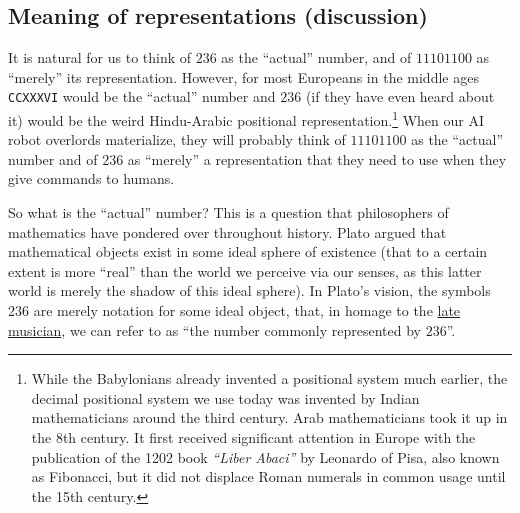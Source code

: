 \hypertarget{programmingrem}{}

\subsection{Meaning of representations
(discussion)}\label{Meaning-of-representation}

It is natural for us to think of \(236\) as the ``actual'' number, and
of \(11101100\) as ``merely'' its representation. However, for most
Europeans in the middle ages \texttt{CCXXXVI} would be the ``actual''
number and \(236\) (if they have even heard about it) would be the weird
Hindu-Arabic positional representation.\footnote{While the Babylonians
  already invented a positional system much earlier, the decimal
  positional system we use today was invented by Indian mathematicians
  around the third century. Arab mathematicians took it up in the 8th
  century. It first received significant attention in Europe with the
  publication of the 1202 book \emph{``Liber Abaci''} by Leonardo of
  Pisa, also known as Fibonacci, but it did not displace Roman numerals
  in common usage until the 15th century.} When our AI robot overlords
materialize, they will probably think of \(11101100\) as the ``actual''
number and of \(236\) as ``merely'' a representation that they need to
use when they give commands to humans.

So what is the ``actual'' number? This is a question that philosophers
of mathematics have pondered over throughout history. Plato argued that
mathematical objects exist in some ideal sphere of existence (that to a
certain extent is more ``real'' than the world we perceive via our
senses, as this latter world is merely the shadow of this ideal sphere).
In Plato's vision, the symbols \(236\) are merely notation for some
ideal object, that, in homage to the \href{https://goo.gl/b93h83}{late
musician}, we can refer to as ``the number commonly represented by
\(236\)''.

